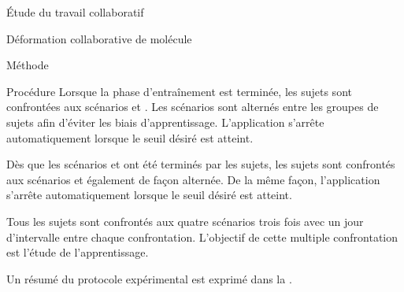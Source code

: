 \documentclass[myfrancais]{mythesis}
\begin{document}
\begin{mypart}{Étude du travail collaboratif}
\begin{mychapter}{Déformation collaborative de molécule}
\begin{mysection}{Méthode}
\begin{mysubsection}{Procédure}
					Lorsque la phase d'entraînement est terminée, les sujets sont confrontées aux scénarios  et .
					Les scénarios sont alternés entre les groupes de sujets afin d'éviter les biais d'apprentissage.
					L'application s'arrête automatiquement lorsque le seuil  désiré est atteint.

					Dès que les scénarios  et  ont été terminés par les sujets, les sujets sont confrontés aux scénarios  et  également de façon alternée.
					De la même façon, l'application s'arrête automatiquement lorsque le seuil  désiré est atteint.

					Tous les sujets sont confrontés aux quatre scénarios trois fois avec un jour d'intervalle entre chaque confrontation.
					L'objectif de cette multiple confrontation est l'étude de l'apprentissage.

					Un résumé du protocole expérimental est exprimé dans la .


\end{mysubsection}
\end{mysection}
\end{mychapter}
\end{mypart}
\end{document}
